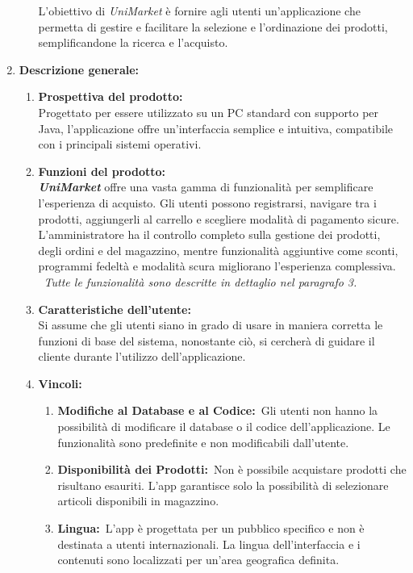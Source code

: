 \documentclass[a4paper,12pt]{article}
\begin{document}
\begin{enumerate}
\begin{enumerate}
    L’obiettivo di \textit{UniMarket} è fornire agli utenti un’applicazione che permetta di gestire e facilitare la selezione e l’ordinazione dei prodotti, semplificandone la ricerca e l’acquisto.
    \end{enumerate}
\item \textbf{Descrizione generale:}
\begin{enumerate}
    \item \textbf{Prospettiva del prodotto:}\\Progettato per essere utilizzato su un PC standard con supporto per Java, l'applicazione offre un'interfaccia semplice e intuitiva, compatibile con i principali sistemi operativi. 
    \item \textbf{Funzioni del prodotto:}\\\textbf{\textit{UniMarket}} offre una vasta gamma di funzionalità per semplificare l’esperienza di acquisto. Gli utenti possono registrarsi, navigare tra i prodotti, aggiungerli al carrello e scegliere modalità di pagamento sicure.\\ L’amministratore ha il controllo completo sulla gestione dei prodotti, degli ordini e del magazzino, mentre funzionalità aggiuntive come sconti, programmi fedeltà e modalità scura migliorano l’esperienza complessiva.\\ \textit{Tutte le funzionalità sono descritte in dettaglio nel paragrafo 3.}
    \item \textbf{Caratteristiche dell'utente:}\\Si assume che gli utenti siano in grado di usare in maniera corretta le funzioni di base del sistema, nonostante ciò, si cercherà di guidare il cliente durante l’utilizzo dell’applicazione.
    \item \textbf{Vincoli:}\\
    \begin{enumerate}
        \item \textbf{Modifiche al Database e al Codice:} Gli utenti non hanno la possibilità di modificare il database o il codice dell'applicazione. Le funzionalità sono predefinite e non modificabili dall'utente.
   
   \item \textbf{Disponibilità dei Prodotti:} Non è possibile acquistare prodotti che risultano esauriti. L'app garantisce solo la possibilità di selezionare articoli disponibili in magazzino.
   
   \item \textbf{Lingua:} L'app è progettata per un pubblico specifico e non è destinata a utenti internazionali. La lingua dell'interfaccia e i contenuti sono localizzati per un'area geografica definita.
   

\end{enumerate}
\end{enumerate}
\end{enumerate}
\end{document}

